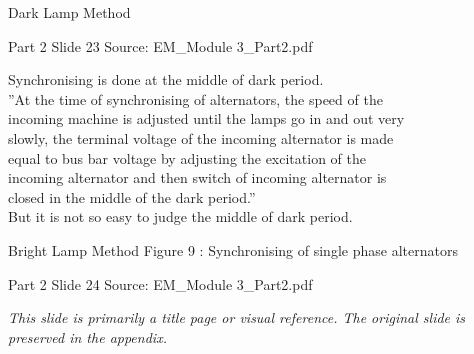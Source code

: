 \documentclass[11pt,a4paper]{article}
\begin{document}
\begin{mdframed}[roundcorner=9pt,backgroundcolor=white,linecolor=anthOrange,linewidth=1pt,innerleftmargin=12pt,innerrightmargin=12pt,innertopmargin=10pt,innerbottommargin=10pt,skipabove=8pt,skipbelow=10pt]
{\HeadingFont\fontsize{15}{18}\selectfont\color{anthDark}Dark Lamp Method\par}
{\color{anthMid}\small Part 2 \textbullet{} Slide 23 \textbullet{} Source: EM\_Module 3\_Part2.pdf\par}
\vspace{0.5em}
{\small
Synchronising is done at the middle of dark period.\\
”At the time of synchronising of alternators, the speed of the\\
incoming machine is adjusted until the lamps go in and out very\\
slowly, the terminal voltage of the incoming alternator is made\\
equal to bus bar voltage by adjusting the excitation of the\\
incoming alternator and then switch of incoming alternator is\\
closed in the middle of the dark period.”\\
But it is not so easy to judge the middle of dark period.\\

}
\end{mdframed}

\begin{mdframed}[roundcorner=9pt,backgroundcolor=white,linecolor=anthBlue,linewidth=1pt,innerleftmargin=12pt,innerrightmargin=12pt,innertopmargin=10pt,innerbottommargin=10pt,skipabove=8pt,skipbelow=10pt]
{\HeadingFont\fontsize{15}{18}\selectfont\color{anthDark}Bright Lamp Method Figure 9 : Synchronising of single phase alternators\par}
{\color{anthMid}\small Part 2 \textbullet{} Slide 24 \textbullet{} Source: EM\_Module 3\_Part2.pdf\par}
\vspace{0.5em}
{\small
\textit{This slide is primarily a title page or visual reference. The original slide is preserved in the appendix.}

}
\end{mdframed}
\end{document}
